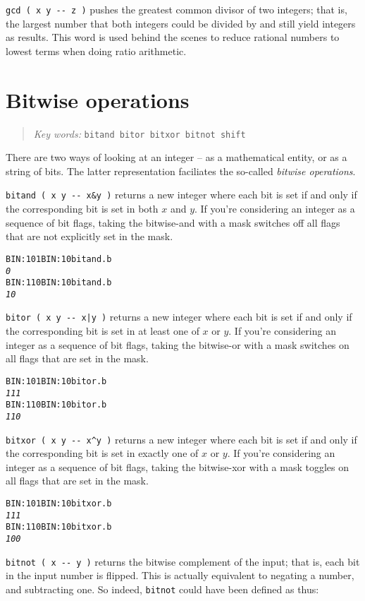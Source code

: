 \documentclass[english]{book}
\newcommand{\chapkeywords}[1]{{\parbox{10cm}{\begin{minipage}[b]{10cm}
\begin{quote}
\emph{Key words:} \texttt{#1}
\end{quote}
\end{minipage}}}}
\begin{document}
\texttt{gcd ( x y -{}- z )} pushes the greatest common divisor of two integers; that is, the largest number that both integers could be divided by and still yield integers as results. This word is used behind the scenes to reduce rational numbers to lowest terms when doing ratio arithmetic.

\section{Bitwise operations}

\chapkeywords{bitand bitor bitxor bitnot shift}

There are two ways of looking at an integer -- as a mathematical entity, or as a string of bits. The latter representation faciliates the so-called \emph{bitwise operations}.

\texttt{bitand ( x y -{}- x\&y )} returns a new integer where each bit is set if and only if the corresponding bit is set in both $x$ and $y$. If you're considering an integer as a sequence of bit flags, taking the bitwise-and with a mask switches off all flags that are not explicitly set in the mask.

\begin{alltt}
BIN: 101 BIN: 10 bitand .b
\emph{0}
BIN: 110 BIN: 10 bitand .b
\emph{10}
\end{alltt}

\texttt{bitor ( x y -{}- x|y )} returns a new integer where each bit is set if and only if the corresponding bit is set in at least one of $x$ or $y$. If you're considering an integer as a sequence of bit flags, taking the bitwise-or with a mask switches on all flags that are set in the mask.

\begin{alltt}
BIN: 101 BIN: 10 bitor .b
\emph{111}
BIN: 110 BIN: 10 bitor .b
\emph{110}
\end{alltt}

\texttt{bitxor ( x y -{}- x\^{}y )} returns a new integer where each bit is set if and only if the corresponding bit is set in exactly one of $x$ or $y$. If you're considering an integer as a sequence of bit flags, taking the bitwise-xor with a mask toggles on all flags that are set in the mask.

\begin{alltt}
BIN: 101 BIN: 10 bitxor .b
\emph{111}
BIN: 110 BIN: 10 bitxor .b
\emph{100}
\end{alltt}

\texttt{bitnot ( x -{}- y )} returns the bitwise complement of the input; that is, each bit in the input number is flipped. This is actually equivalent to negating a number, and subtracting one. So indeed, \texttt{bitnot} could have been defined as thus:
\end{document}
